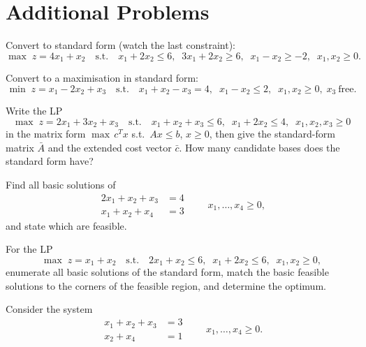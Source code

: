 \section{Additional Problems}

\begin{problems}
  \item Convert to standard form (watch the last constraint):
        \[
          \max\; z=4x_{1}+x_{2}
          \quad\text{s.t.}\quad
          x_{1}+2x_{2}\le 6,\;\;
          3x_{1}+2x_{2}\ge 6,\;\;
          x_{1}-x_{2}\ge -2,\;\;
          x_{1},x_{2}\ge 0 .
        \]
  \item Convert to a maximisation in standard form:
        \[
          \min\; z=x_{1}-2x_{2}+x_{3}
          \quad\text{s.t.}\quad
          x_{1}+x_{2}-x_{3}=4,\;\;
          x_{1}-x_{2}\le 2,\;\;
          x_{1},x_{2}\ge 0,\; x_{3}\ \text{free}.
        \]
  \item Write the LP
        \[
          \max\; z=2x_{1}+3x_{2}+x_{3}
          \quad\text{s.t.}\quad
          x_{1}+x_{2}+x_{3}\le 6,\;\;
          x_{1}+2x_{2}\le 4,\;\;
          x_{1},x_{2},x_{3}\ge 0
        \]
        in the matrix form $\max\,c^{T}x$ s.t.\ $Ax\le b$, $x\ge 0$, then
        give the standard-form matrix $\bar{A}$ and the extended cost
        vector $\bar{c}$. How many candidate bases does the standard form
        have?
  \item Find all basic solutions of
        \[
          \begin{aligned}
            2x_{1}+x_{2}+x_{3} &= 4\\
            x_{1}+x_{2}+x_{4} &= 3
          \end{aligned}
          \qquad x_{1},\dots,x_{4}\ge 0 ,
        \]
        and state which are feasible.
  \item For the LP
        \[
          \max\; z=x_{1}+x_{2}
          \quad\text{s.t.}\quad
          2x_{1}+x_{2}\le 6,\;\;
          x_{1}+2x_{2}\le 6,\;\;
          x_{1},x_{2}\ge 0 ,
        \]
        enumerate all basic solutions of the standard form, match the
        basic feasible solutions to the corners of the feasible region,
        and determine the optimum.
  \item Consider the system
        \[
          \begin{aligned}
            x_{1}+x_{2}+x_{3} &= 3\\
            x_{2}+x_{4} &= 1
          \end{aligned}
          \qquad x_{1},\dots,x_{4}\ge 0 .
        \]

\end{problems}
